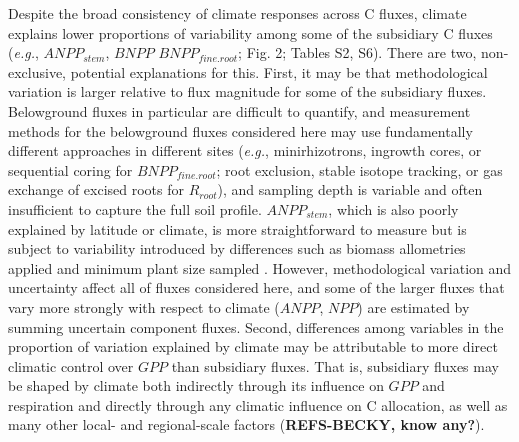 \documentclass[
]{article}
\begin{document}
Despite the broad consistency of climate responses across C fluxes,
climate explains lower proportions of variability among some of the
subsidiary C fluxes (\emph{e.g.}, \(ANPP_{stem}\), \(BNPP\)
\(BNPP_{fine.root}\); Fig. 2; Tables S2, S6). There are two,
non-exclusive, potential explanations for this. First, it may be that
methodological variation is larger relative to flux magnitude for some
of the subsidiary fluxes. Belowground fluxes in particular are difficult
to quantify, and measurement methods for the belowground fluxes
considered here may use fundamentally different approaches in different
sites (\emph{e.g.}, minirhizotrons, ingrowth cores, or sequential coring
for \(BNPP_{fine.root}\); root exclusion, stable isotope tracking, or
gas exchange of excised roots for \(R_{root}\)), and sampling depth is
variable and often insufficient to capture the full soil profile.
\(ANPP_{stem}\), which is also poorly explained by latitude or climate,
is more straightforward to measure but is subject to variability
introduced by differences such as biomass allometries applied and
minimum plant size sampled \citep{clark_measuring_2001}. However,
methodological variation and uncertainty affect all of fluxes considered
here, and some of the larger fluxes that vary more strongly with respect
to climate (\(ANPP\), \(NPP\)) are estimated by summing uncertain
component fluxes. Second, differences among variables in the proportion
of variation explained by climate may be attributable to more direct
climatic control over \(GPP\) than subsidiary fluxes. That is,
subsidiary fluxes may be shaped by climate both indirectly through its
influence on \(GPP\) and respiration and directly through any climatic
influence on C allocation, as well as many other local- and
regional-scale factors \citep[e.g.,][]{moser_elevation_2011}
(\textbf{REFS-BECKY, know any?}).
\end{document}
